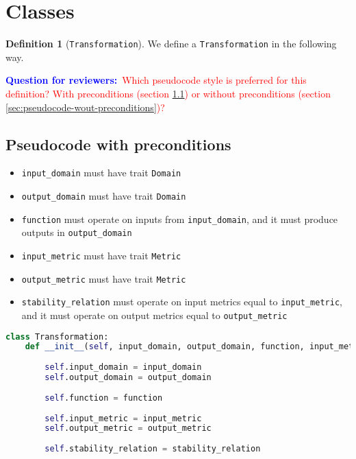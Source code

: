 \documentclass[11pt,a4paper]{article}
\theoremstyle{definition}
\newtheorem{definition}[theorem]{Definition}
\newcommand{\questionr}[1]{\textcolor{blue}{\textbf{Question for reviewers:}}\textcolor{red}{~#1}}
\begin{document}
\section{Classes}

\begin{definition}[\texttt{Transformation}]
    We define a \texttt{Transformation} in the following way.
    
    \questionr{Which pseudocode style is preferred for this definition? With preconditions (section \ref{sec:pseudocode-w-preconditions}) or without preconditions (section \ref{sec:pseudocode-wout-preconditions})?}
    
\subsection{Pseudocode with preconditions}
\label{sec:pseudocode-w-preconditions}

\begin{itemize}
    \item \texttt{input\_domain} must have trait \texttt{Domain}
    \item \texttt{output\_domain} must have trait \texttt{Domain}
    \item \texttt{function} must operate on inputs from \texttt{input\_domain}, and it must produce outputs in \texttt{output\_domain}
    \item \texttt{input\_metric} must have trait \texttt{Metric}
    \item \texttt{output\_metric} must have trait \texttt{Metric}
    \item \texttt{stability\_relation} must operate on input metrics equal to \texttt{input\_metric}, and it must operate on output metrics equal to \texttt{output\_metric}
\end{itemize}

\begin{lstlisting}[language=Python]
class Transformation:
    def __init__(self, input_domain, output_domain, function, input_metric, output_metric, stability_relation):
    	
        self.input_domain = input_domain
        self.output_domain = output_domain
        
        self.function = function
        
        self.input_metric = input_metric
        self.output_metric = output_metric
        
        self.stability_relation = stability_relation
\end{lstlisting}
    

\end{definition}
\end{document}
